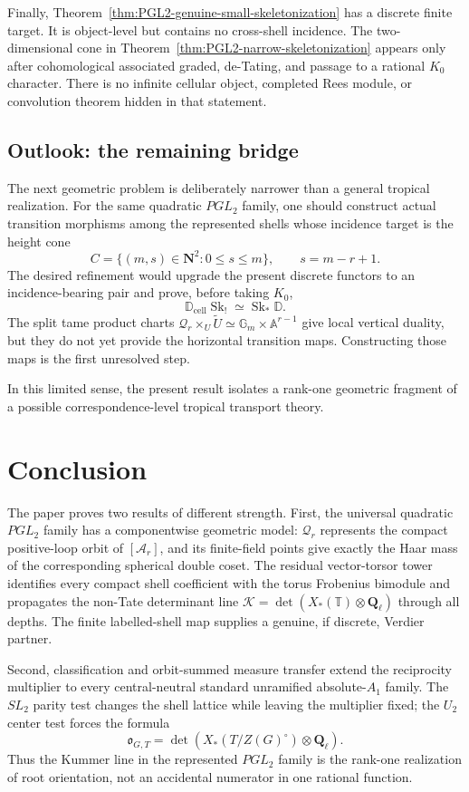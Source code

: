 \documentclass[11pt]{article}
\theoremstyle{definition}
\theoremstyle{remark}
\newcommand{\Qell}{\mathbf Q_\ell}
\newcommand{\cK}{\mathcal K}
\newcommand{\D}{\mathbb D}
\newcommand{\Dcell}{\mathbb D_{\mathrm{cell}}}
\newcommand{\Sk}{\operatorname{Sk}}
\begin{document}
Finally, Theorem~\ref{thm:PGL2-genuine-small-skeletonization} has a discrete
finite target.  It is object-level but contains no cross-shell incidence.
The two-dimensional cone in
Theorem~\ref{thm:PGL2-narrow-skeletonization} appears only after
cohomological associated graded, de-Tating, and passage to a rational
$K_0$ character.  There is no infinite cellular object, completed Rees
module, or convolution theorem hidden in that statement.

\subsection{Outlook: the remaining bridge}

The next geometric problem is deliberately narrower than a general tropical
realization.  For the same quadratic $PGL_2$ family, one should construct
actual transition morphisms among the represented shells whose incidence
target is the height cone
\[
 C=\{(m,s)\in\mathbf N^2:0\le s\le m\},
 \qquad s=m-r+1.
\]
The desired refinement would upgrade the present discrete functors to an
incidence-bearing pair and prove, before taking $K_0$,
\[
 \Dcell\Sk_!\simeq\Sk_*\D.
\]
The split tame product charts
$\mathscr Q_r\times_U\widetilde U\simeq\mathbb G_m\times\mathbb A^{r-1}$
give local vertical duality, but they do not yet provide the horizontal
transition maps.  Constructing those maps is the first unresolved step.

In this limited sense, the present result isolates a rank-one geometric
fragment of a possible correspondence-level tropical transport theory.

\section{Conclusion}

The paper proves two results of different strength.  First, the universal
quadratic $PGL_2$ family has a componentwise geometric model:
$\mathscr Q_r$ represents the compact positive-loop orbit of
$[\mathcal A_r]$, and its finite-field points give exactly the Haar mass of
the corresponding spherical double coset.  The residual vector-torsor tower
identifies every compact shell coefficient with the torus Frobenius bimodule
and propagates the non-Tate determinant line
$\cK=\det(X_*(\mathbb T)\otimes\Qell)$ through all depths.  The finite
labelled-shell map supplies a genuine, if discrete, Verdier partner.

Second, classification and orbit-summed measure transfer extend the
reciprocity multiplier to every central-neutral standard unramified
absolute-$A_1$ family.  The $SL_2$ parity test changes the shell lattice while
leaving the multiplier fixed; the $U_2$ center test forces the formula
\[
 \mathfrak o_{G,T}
 =\det\!\left(X_*(T/Z(G)^\circ)\otimes\Qell\right).
\]
Thus the Kummer line in the represented $PGL_2$ family is the rank-one
realization of root orientation, not an accidental numerator in one rational
function.
\end{document}
